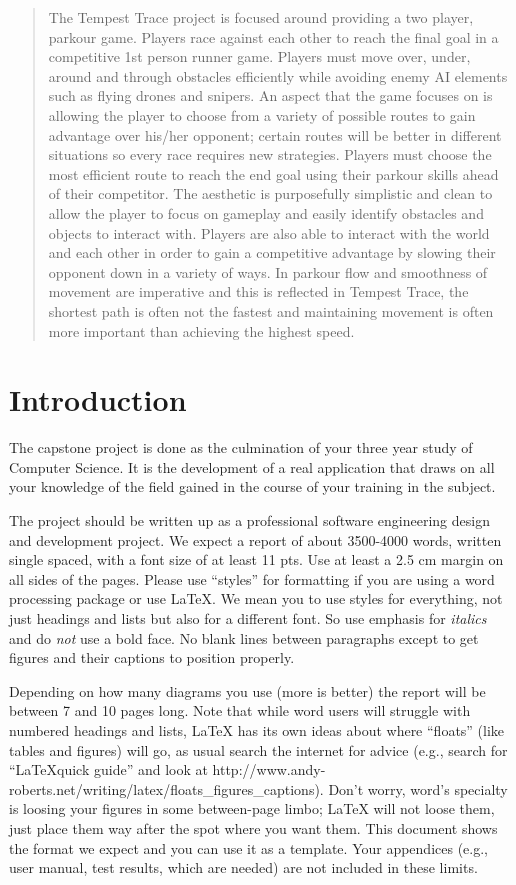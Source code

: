 \documentclass[11pt,a4paper]{article}
\begin{document}
\begin{abstract}
 The Tempest Trace project is focused around providing a two player, parkour game. Players race against each other to reach the final goal in a competitive 1st person runner game. Players must move over, under, around and through obstacles efficiently while avoiding enemy AI elements such as flying drones and snipers. An aspect that the game focuses on is allowing the player to choose from a variety of possible routes to gain advantage over his/her opponent; certain routes will be better in different situations so every race requires new strategies.  Players must choose the most efficient route to reach the end goal using their parkour skills ahead of their competitor. The aesthetic is purposefully simplistic and clean to allow the player to focus on gameplay and easily identify obstacles and objects to interact with. Players are also able to interact with the world and each other in order to gain a competitive advantage by slowing their opponent down in a variety of ways. In parkour flow and smoothness of movement are imperative and this is reflected in Tempest Trace, the shortest path is often not the fastest and maintaining movement is often more important than achieving the highest speed.
\end{abstract}

\section{Introduction}
The capstone project is done as the culmination of your three year
study of Computer Science. It is the development of a real application
that draws on all your knowledge of the field gained in the course of
your training in the subject.

The project should be written up as a professional software
engineering design and development project. We expect a report of
about 3500-4000 words, written single spaced, with a font size of at
least 11 pts. Use at least a 2.5 cm margin on all sides of the
pages. Please use ``styles'' for formatting if you are using a word
processing package or use \LaTeX. We mean you to use styles for
everything, not just headings and lists but also for a different
font. So use emphasis for \emph{italics} and do \emph{not} use a bold
face. No blank lines between paragraphs except to get figures and
their captions to position properly.

Depending on how many diagrams you use (more is better) the report
will be between 7 and 10 pages long. Note that while word users will
struggle with numbered headings and lists, \LaTeX\/ has its own ideas
about where ``floats'' (like tables and figures) will go, as usual
search the internet for advice (e.g., search for ``\LaTeX quick
guide'' and look at
http://www.andy-roberts.net/writing/latex/floats\_figures\_captions). Don't
worry, word's specialty is loosing your figures in some between-page
limbo; \LaTeX\/ will not loose them, just place them way after the
spot where you want them.  This document shows the format we expect
and you can use it as a template.  Your appendices (e.g., user manual,
test results, which are needed) are not included in these limits.
\end{document}
